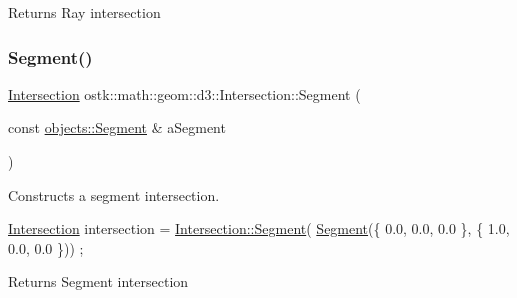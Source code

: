 \begin{DoxyReturn}{Returns}
Ray intersection 
\end{DoxyReturn}
\mbox{\label{classostk_1_1math_1_1geom_1_1d3_1_1_intersection_a993d41317e731ddc303e716fbc603546}} 
\subsubsection{\texorpdfstring{Segment()}{Segment()}}
{\footnotesize\ttfamily \hyperlink{classostk_1_1math_1_1geom_1_1d3_1_1_intersection}{Intersection} ostk\+::math\+::geom\+::d3\+::\+Intersection\+::\+Segment (\begin{DoxyParamCaption}\item[{const \hyperlink{classostk_1_1math_1_1geom_1_1d3_1_1objects_1_1_segment}{objects\+::\+Segment} \&}]{a\+Segment }\end{DoxyParamCaption})\hspace{0.3cm}{\ttfamily [static]}}



Constructs a segment intersection. 


\begin{DoxyCode}
\hyperlink{classostk_1_1math_1_1geom_1_1d3_1_1_intersection_a6091ab689809d0da1e670ca18dffb2d8}{Intersection} intersection = \hyperlink{classostk_1_1math_1_1geom_1_1d3_1_1_intersection_a993d41317e731ddc303e716fbc603546}{Intersection::Segment}(
      \hyperlink{classostk_1_1math_1_1geom_1_1d3_1_1_intersection_a993d41317e731ddc303e716fbc603546}{Segment}(\{ 0.0, 0.0, 0.0 \}, \{ 1.0, 0.0, 0.0 \})) ;
\end{DoxyCode}


\begin{DoxyReturn}{Returns}
Segment intersection 
\end{DoxyReturn}
\mbox{\label{classostk_1_1math_1_1geom_1_1d3_1_1_intersection_a13f5a3681c7a0f4892724bdd91247e05}} 
